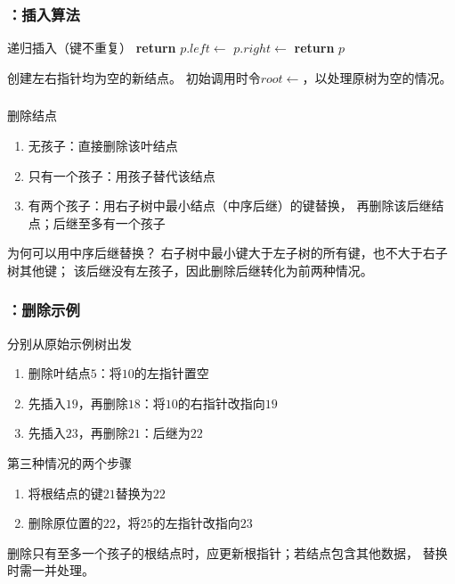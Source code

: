 \begin{fragile}
    \frametitle{\insertsectionhead：插入算法}
    \begin{algorithmx}{递归插入（键不重复）}
        \State \textbf{return} 
        \EndIf
        \State $p.left\gets$ 
        \State $p.right\gets$ 
        \EndIf
        \State \textbf{return} $p$
        \EndProcedure
    \end{algorithmx}
    创建左右指针均为空的新结点。
    初始调用时令$root\gets$，以处理原树为空的情况。
\end{fragile}

\begin{frame}
    \frametitle{\insertsectionhead}
    \begin{block}{删除结点}
        \begin{enumerate}
            \item 无孩子：直接删除该叶结点
            \item 只有一个孩子：用孩子替代该结点
            \item 有两个孩子：用右子树中最小结点（中序后继）的键替换，
                  再删除该后继结点；后继至多有一个孩子
        \end{enumerate}
    \end{block}
    \begin{exampleblock}{为何可以用中序后继替换？}
        右子树中最小键大于左子树的所有键，也不大于右子树其他键；
        该后继没有左孩子，因此删除后继转化为前两种情况。
    \end{exampleblock}
\end{frame}

\begin{frame}
    \frametitle{\insertsectionhead：删除示例}
    \begin{block}{分别从原始示例树出发}
        \begin{enumerate}
            \item 删除叶结点$5$：将$10$的左指针置空
            \item 先插入$19$，再删除$18$：将$10$的右指针改指向$19$
            \item 先插入$23$，再删除$21$：后继为$22$
        \end{enumerate}
    \end{block}
    \begin{exampleblock}{第三种情况的两个步骤}
        \begin{enumerate}
            \item 将根结点的键$21$替换为$22$
            \item 删除原位置的$22$，将$25$的左指针改指向$23$
        \end{enumerate}
    \end{exampleblock}
    删除只有至多一个孩子的根结点时，应更新根指针；若结点包含其他数据，
    替换时需一并处理。
\end{frame}

